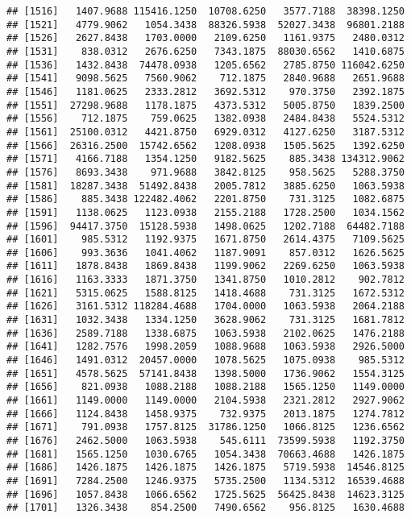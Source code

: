 \documentclass[]{article}
\begin{document}
\begin{verbatim}
## [1516]   1407.9688 115416.1250  10708.6250   3577.7188  38398.1250
## [1521]   4779.9062   1054.3438  88326.5938  52027.3438  96801.2188
## [1526]   2627.8438   1703.0000   2109.6250   1161.9375   2480.0312
## [1531]    838.0312   2676.6250   7343.1875  88030.6562   1410.6875
## [1536]   1432.8438  74478.0938   1205.6562   2785.8750 116042.6250
## [1541]   9098.5625   7560.9062    712.1875   2840.9688   2651.9688
## [1546]   1181.0625   2333.2812   3692.5312    970.3750   2392.1875
## [1551]  27298.9688   1178.1875   4373.5312   5005.8750   1839.2500
## [1556]    712.1875    759.0625   1382.0938   2484.8438   5524.5312
## [1561]  25100.0312   4421.8750   6929.0312   4127.6250   3187.5312
## [1566]  26316.2500  15742.6562   1208.0938   1505.5625   1392.6250
## [1571]   4166.7188   1354.1250   9182.5625    885.3438 134312.9062
## [1576]   8693.3438    971.9688   3842.8125    958.5625   5288.3750
## [1581]  18287.3438  51492.8438   2005.7812   3885.6250   1063.5938
## [1586]    885.3438 122482.4062   2201.8750    731.3125   1082.6875
## [1591]   1138.0625   1123.0938   2155.2188   1728.2500   1034.1562
## [1596]  94417.3750  15128.5938   1498.0625   1202.7188  64482.7188
## [1601]    985.5312   1192.9375   1671.8750   2614.4375   7109.5625
## [1606]    993.3636   1041.4062   1187.9091    857.0312   1626.5625
## [1611]   1878.8438   1869.8438   1199.9062   2269.6250   1063.5938
## [1616]   1163.3333   1871.3750   1341.8750   1010.2812    902.7812
## [1621]   5315.0625   1588.8125   1418.4688    731.3125   1672.5312
## [1626]   3161.5312 118284.4688   1704.0000   1063.5938   2064.2188
## [1631]   1032.3438   1334.1250   3628.9062    731.3125   1681.7812
## [1636]   2589.7188   1338.6875   1063.5938   2102.0625   1476.2188
## [1641]   1282.7576   1998.2059   1088.9688   1063.5938   2926.5000
## [1646]   1491.0312  20457.0000   1078.5625   1075.0938    985.5312
## [1651]   4578.5625  57141.8438   1398.5000   1736.9062   1554.3125
## [1656]    821.0938   1088.2188   1088.2188   1565.1250   1149.0000
## [1661]   1149.0000   1149.0000   2104.5938   2321.2812   2927.9062
## [1666]   1124.8438   1458.9375    732.9375   2013.1875   1274.7812
## [1671]    791.0938   1757.8125  31786.1250   1066.8125   1236.6562
## [1676]   2462.5000   1063.5938    545.6111  73599.5938   1192.3750
## [1681]   1565.1250   1030.6765   1054.3438  70663.4688   1426.1875
## [1686]   1426.1875   1426.1875   1426.1875   5719.5938  14546.8125
## [1691]   7284.2500   1246.9375   5735.2500   1134.5312  16539.4688
## [1696]   1057.8438   1066.6562   1725.5625  56425.8438  14623.3125
## [1701]   1326.3438    854.2500   7490.6562    956.8125   1630.4688

\end{verbatim}
\end{document}
